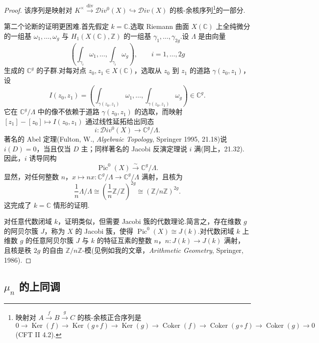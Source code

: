 \begin{proof}
该序列是映射对 $K^{\times} \xrightarrow{\mathrm{div}} \mathcal{D}iv^{0}(X) \hookrightarrow \mathcal{D}iv(X)$ 的核-余核序列\footnote{映射对 $A \xrightarrow{f} B \xrightarrow{g} C$ 的核-余核正合序列是
\[
0 \to \operatorname{Ker}(f) \to \operatorname{Ker}(g \circ f) \to \operatorname{Ker}(g) \to \operatorname{Coker}(f) \to \operatorname{Coker}(g \circ f) \to \operatorname{Coker}(g) \to 0
\]
(CFT II 4.2).}的一部分.

第二个论断的证明更困难.首先假定 $k = \mathbb{C}$.选取 Riemann 曲面 $X(\mathbb{C})$ 上全纯微分的一组基 $\omega_1, \ldots, \omega_g$ 与 $H_1(X(\mathbb{C}), \mathbb{Z})$ 的一组基 $\gamma_1, \ldots, \gamma_{2g}$.设 $\Lambda$ 是由向量
\[
\left( \int_{\gamma_i} \omega_1, \ldots, \int_{\gamma_i} \omega_g \right), \qquad i = 1, \ldots, 2g
\]
生成的 $\mathbb{C}^{g}$ 的子群.对每对点 $z_0, z_1 \in X(\mathbb{C})$，选取从 $z_0$ 到 $z_1$ 的道路 $\gamma(z_0, z_1)$，设
\[
I(z_0, z_1) = \left( \int_{\gamma(z_0, z_1)} \omega_1, \ldots, \int_{\gamma(z_0, z_1)} \omega_g \right) \in \mathbb{C}^{g}.
\]
它在 $\mathbb{C}^{g}/\Lambda$ 中的像不依赖于道路 $\gamma(z_0, z_1)$ 的选取，而映射 $[z_1] - [z_0] \mapsto I(z_0, z_1)$ 通过线性延拓给出同态
\[
i \colon \mathcal{D}iv^{0}(X) \to \mathbb{C}^{g}/\Lambda.
\]
著名的 Abel 定理(Fulton, W., \emph{Algebraic Topology}, Springer 1995, 21.18)说 $i(D) = 0$，当且仅当 $D$ 主；同样著名的 Jacobi 反演定理说 $i$ 满(同上，21.32).因此，$i$ 诱导同构
\[
\operatorname{Pic}^{0}(X) \xrightarrow{\sim} \mathbb{C}^{g}/\Lambda.
\]
显然，对任何整数 $n$，$x \mapsto nx \colon \mathbb{C}^{g}/\Lambda \to \mathbb{C}^{g}/\Lambda$ 满射，且核为
\[
\frac{1}{n}\Lambda/\Lambda \cong \left(\frac{1}{n}\mathbb{Z}/\mathbb{Z}\right)^{2g} \cong (\mathbb{Z}/n\mathbb{Z})^{2g}.
\]
这完成了 $k = \mathbb{C}$ 情形的证明.

对任意代数闭域 $k$，证明类似，但需要 Jacobi 簇的代数理论.简言之，存在维数 $g$ 的阿贝尔簇 $J$，称为 $X$ 的 Jacobi 簇，使得 $\operatorname{Pic}^{0}(X) \cong J(k)$.对代数闭域 $k$ 上维数 $g$ 的任意阿贝尔簇 $J$ 与 $k$ 的特征互素的整数 $n$，$n \colon J(k) \to J(k)$ 满射，且核是秩 $2g$ 的自由 $\mathbb{Z}/n\mathbb{Z}$-模(见例如我的文章，\emph{Arithmetic Geometry}, Springer, 1986).
\end{proof}

\subsection*{\texorpdfstring{$\mu_n$ 的上同调}{mu_n 的上同调}}

